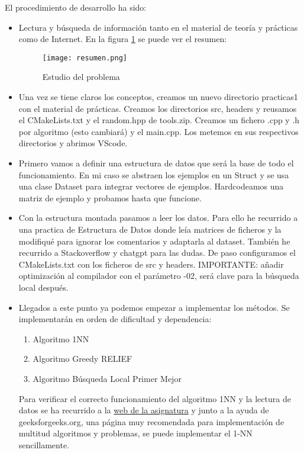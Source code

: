 El procedimiento de desarrollo ha sido:
\begin{itemize}
	\item Lectura y búsqueda de información tanto en el material de teoría y prácticas como de Internet. En la figura \ref{fig:mi_imagen} se puede ver el resumen:
	\begin{figure}[h]
		\centering
		\texttt{[image: resumen.png]}
		\caption{Estudio del problema}
		\label{fig:mi_imagen}
	\end{figure}

	\item Una vez se tiene claros los conceptos, creamos un nuevo directorio practicas1 con el material de prácticas. Creamos los directorios src, headers y reusamos el CMakeLists.txt y el random.hpp de tools.zip. Creamos un fichero .cpp y .h por algoritmo (esto cambiará) y el main.cpp. Los metemos en sus respectivos directorios y abrimos VScode.
	
	\item Primero vamos a definir una estructura de datos que será la base de todo el funcionamiento. En mi caso se abstraen los ejemplos en un Struct y se usa una clase Dataset para integrar vectores de ejemplos. Hardcodeamos una matriz de ejemplo y probamos hasta que funcione.
	
	\item Con la estructura montada pasamos a leer los datos. Para ello he recurrido a una practica de Estructura de Datos donde leía matrices de ficheros y la modifiqué para ignorar los comentarios y adaptarla al dataset.
	También he recurrido a Stackoverflow y chatgpt para las dudas. De paso configuramos el CMakeLists.txt con los ficheros de src y headers. IMPORTANTE: añadir optimización al compilador con el parámetro -02, será clave para la búsqueda local después.
	
	\item Llegados a este punto ya podemos empezar a implementar los métodos. Se implementarán en orden de dificultad y dependencia:
	\begin{enumerate}
		\item Algoritmo 1NN
		\item Algoritmo Greedy RELIEF
		\item Algoritmo Búsqueda Local Primer Mejor
	\end{enumerate}
	Para verificar el correcto funcionamiento del algoritmo 1NN y la lectura de datos se ha recurrido a la  \href{https://mh2223.danimolina.net/testsol.html}{web de la asignatura} y junto a la ayuda de geeksforgeeks.org\cite{greekforgeeks}, una página muy recomendada para implementación de multitud algoritmos y problemas, se puede implementar el 1-NN sencillamente. 
	

\end{itemize}
